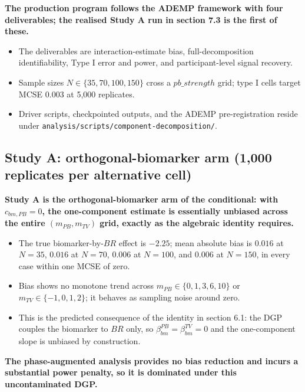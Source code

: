 \documentclass[
  11pt,
]{article}
\begin{document}
\textbf{The production program follows the ADEMP framework with four deliverables; the realised Study A run in section 7.3 is the first of these.}

\begin{itemize}\setlength{\itemsep}{2pt}\setlength{\parskip}{0pt}
\item The deliverables are interaction-estimate bias, full-decomposition identifiability, Type I error and power, and participant-level signal recovery.
\item Sample sizes $N \in \{35,70,100,150\}$ cross a $pb\_strength$ grid; type I cells target MCSE $0.003$ at 5{,}000 replicates.
\item Driver scripts, checkpointed outputs, and the ADEMP pre-registration reside under \texttt{analysis/scripts/component-decomposition/}.
\end{itemize}

\subsection{Study A: orthogonal-biomarker arm (1,000 replicates per alternative cell)}\label{study-a-orthogonal-biomarker-arm-1000-replicates-per-alternative-cell}

\textbf{Study A is the orthogonal-biomarker arm of the conditional: with $c_{bm,PB} = 0$, the one-component estimate is essentially unbiased across the entire $(m_{PB}, m_{TV})$ grid, exactly as the algebraic identity requires.}

\begin{itemize}\setlength{\itemsep}{2pt}\setlength{\parskip}{0pt}
\item The true biomarker-by-$BR$ effect is $-2.25$; mean absolute bias is $0.016$ at $N=35$, $0.016$ at $N=70$, $0.006$ at $N=100$, and $0.006$ at $N=150$, in every case within one MCSE of zero.
\item Bias shows no monotone trend across $m_{PB} \in \{0,1,3,6,10\}$ or $m_{TV} \in \{-1,0,1,2\}$; it behaves as sampling noise around zero.
\item This is the predicted consequence of the identity in section 6.1: the DGP couples the biomarker to $BR$ only, so $\beta_{bm}^{PB} = \beta_{bm}^{TV} = 0$ and the one-component slope is unbiased by construction.
\end{itemize}

\textbf{The phase-augmented analysis provides no bias reduction and incurs a substantial power penalty, so it is dominated under this uncontaminated DGP.}
\end{document}
